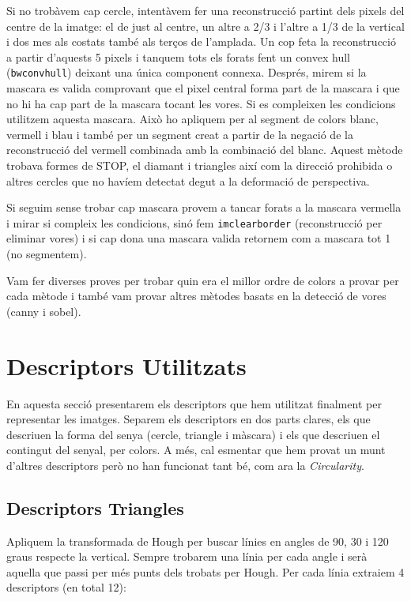 Si no trobàvem cap cercle, intentàvem fer una reconstrucció partint dels pixels
del centre de la imatge: el de just al centre, un altre a 2/3 i l'altre a 1/3
de la vertical i dos mes als costats també als terços de l'amplada. Un cop feta
la reconstrucció a partir d'aquests 5 pixels i tanquem tots els forats fent un
convex hull (\texttt{bwconvhull}) deixant una única component connexa. Després,
mirem si la mascara es valida comprovant que el pixel central forma part de la
mascara i que no hi ha cap part de la mascara tocant les vores. Si es compleixen
les condicions utilitzem aquesta mascara. Això ho apliquem per al segment de
colors blanc, vermell i blau i també per un segment creat a partir de la negació
de la reconstrucció del vermell combinada amb la combinació del blanc. Aquest
mètode trobava formes de STOP, el diamant i triangles així com la direcció
prohibida o altres cercles que no havíem detectat degut a la deformació de
perspectiva.

Si seguim sense trobar cap mascara provem a tancar forats a la mascara vermella
i mirar si compleix les condicions, sinó fem \texttt{imclearborder}
(reconstrucció per eliminar vores) i si cap dona una mascara valida retornem com
a mascara tot 1 (no segmentem).

Vam fer diverses proves per trobar quin era el millor ordre de colors a provar
per cada mètode i també vam provar altres mètodes basats en la detecció de vores
(canny i sobel).


\section{Descriptors Utilitzats}%
\label{sec:desc}

En aquesta secció presentarem els descriptors que hem utilitzat finalment per
representar les imatges. Separem els descriptors en dos parts clares, els que descriuen
la forma del senya (cercle, triangle i màscara) i els que descriuen el contingut del
senyal, per colors.
A més, cal esmentar que hem provat un
munt d'altres descriptors però no han funcionat tant bé, com ara la \emph{Circularity}.


\subsection{Descriptors Triangles}

Apliquem la transformada de Hough per buscar línies en angles de 90, 30 i 120 graus respecte la vertical. Sempre trobarem una línia per cada angle i serà aquella que passi
per més punts dels trobats per Hough.
Per cada línia extraiem 4 descriptors (en total 12):

